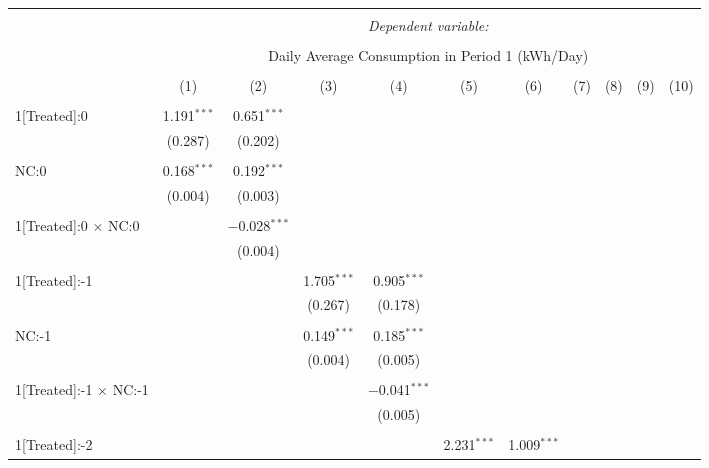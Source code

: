 
\begin{table}[!htbp] \centering 
  \caption{} 
  \label{} 
\footnotesize 
\begin{tabular}{@{\extracolsep{5pt}}lcccccccccc} 
\\[-1.8ex]\hline 
\hline \\[-1.8ex] 
 & \multicolumn{10}{c}{\textit{Dependent variable:}} \\ 
\cline{2-11} 
\\[-1.8ex] & \multicolumn{10}{c}{Daily Average Consumption in Period 1 (kWh/Day)} \\ 
\\[-1.8ex] & (1) & (2) & (3) & (4) & (5) & (6) & (7) & (8) & (9) & (10)\\ 
\hline \\[-1.8ex] 
 1[Treated]:0 & 1.191$^{***}$ & 0.651$^{***}$ &  &  &  &  &  &  &  &  \\ 
  & (0.287) & (0.202) &  &  &  &  &  &  &  &  \\ 
  & & & & & & & & & & \\ 
 NC:0 & 0.168$^{***}$ & 0.192$^{***}$ &  &  &  &  &  &  &  &  \\ 
  & (0.004) & (0.003) &  &  &  &  &  &  &  &  \\ 
  & & & & & & & & & & \\ 
 1[Treated]:0 $\times$ NC:0 &  & $-$0.028$^{***}$ &  &  &  &  &  &  &  &  \\ 
  &  & (0.004) &  &  &  &  &  &  &  &  \\ 
  & & & & & & & & & & \\ 
 1[Treated]:-1 &  &  & 1.705$^{***}$ & 0.905$^{***}$ &  &  &  &  &  &  \\ 
  &  &  & (0.267) & (0.178) &  &  &  &  &  &  \\ 
  & & & & & & & & & & \\ 
 NC:-1 &  &  & 0.149$^{***}$ & 0.185$^{***}$ &  &  &  &  &  &  \\ 
  &  &  & (0.004) & (0.005) &  &  &  &  &  &  \\ 
  & & & & & & & & & & \\ 
 1[Treated]:-1 $\times$ NC:-1 &  &  &  & $-$0.041$^{***}$ &  &  &  &  &  &  \\ 
  &  &  &  & (0.005) &  &  &  &  &  &  \\ 
  & & & & & & & & & & \\ 
 1[Treated]:-2 &  &  &  &  & 2.231$^{***}$ & 1.009$^{***}$ &  &  &  &  \\ 

\end{tabular}
\end{table}

